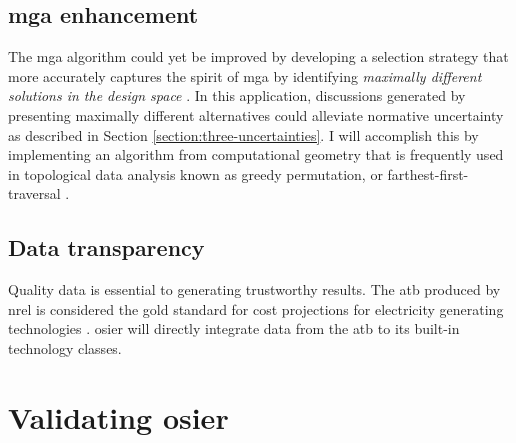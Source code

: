 \subsection{\ac{mga} enhancement}

The \ac{mga} algorithm could yet be improved by developing a selection strategy
that more accurately captures the spirit of \ac{mga} by identifying 
\textit{maximally different solutions in the design space} 
\cite{decarolis_using_2011,yue_review_2018}. In this application, discussions
generated by presenting maximally different alternatives could alleviate
normative uncertainty as described in Section \ref{section:three-uncertainties}.
I will accomplish this by implementing an algorithm from computational geometry
that is frequently used in topological data analysis known as greedy
permutation, or farthest-first-traversal
\cite{cavanna_geometric_2015,eppstein_approximate_2020}.


\subsection{Data transparency}

Quality data is essential to generating trustworthy results. The \ac{atb}
produced by \ac{nrel} is considered the gold standard for cost projections for
electricity generating technologies \cite{nrel_2020_2020}. \ac{osier} will
directly integrate data from the \ac{atb} to its built-in technology classes.


\section{Validating \ac{osier}}

